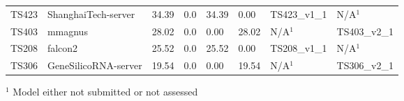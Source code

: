 \begin{table}[ht]
{\begin{tabular}{llllllll}
TS423 & ShanghaiTech-server & 34.39 & 0.0 & 34.39 & 0.00 & TS423\_v1\_1 & N/A$^{1}$ \\ 
TS403 & mmagnus & 28.02 & 0.0 & 0.00 & 28.02 & N/A$^{1}$ & TS403\_v2\_1 \\ 
TS208 & falcon2 & 25.52 & 0.0 & 25.52 & 0.00 & TS208\_v1\_1 & N/A$^{1}$ \\ 
TS306 & GeneSilicoRNA-server & 19.54 & 0.0 & 0.00 & 19.54 & N/A$^{1}$ & TS306\_v2\_1 \\ 
\bottomrule
\end{tabular}%
}
\begin{flushleft}\footnotesize $^{1}$ Model either not submitted or not assessed\end{flushleft}
\end{table}
